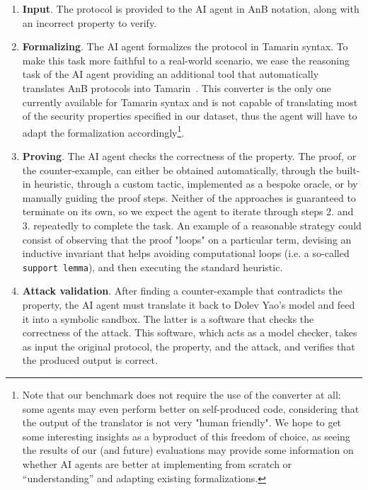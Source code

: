 \begin{enumerate}
    \item \textbf{Input}. The protocol is provided to the AI agent in AnB notation, along with an incorrect property to verify.
    \item \textbf{Formalizing}. The AI agent formalizes the protocol in Tamarin syntax. To make this task more faithful to a real-world scenario, we ease the reasoning task of the AI agent providing an additional tool that automatically translates AnB protocols into Tamarin~\cite{basin2015alice}. This converter is the only one currently available for Tamarin syntax and is not capable of translating most of the security properties specified in our dataset, thus the agent will have to adapt the formalization accordingly\footnote{Note that our benchmark does not require the use of the converter at all: some agents may even perform better on self-produced code, considering that the output of the translator is not very "human friendly". We hope to get some interesting insights as a byproduct of this freedom of choice, as seeing the results of our (and future) evaluations may provide some information on whether AI agents are better at implementing from scratch or “understanding” and adapting existing formalizations.}.
    \item \textbf{Proving}. The AI agent checks the correctness of the property. The proof, or the counter-example, can either be obtained automatically, through the built-in heuristic, through a custom tactic, implemented as a bespoke oracle, or by manually guiding the proof steps. Neither of the approaches is guaranteed to terminate on its own, so we expect the agent to iterate through steps 2. and 3. repeatedly to complete the task. An example of a reasonable strategy could consist of observing that the proof "loops" on a particular term, devising an inductive invariant that helps avoiding computational loops (i.e. a so-called \texttt{support lemma}), and then executing the standard heuristic.
    \item \textbf{Attack validation}. After finding a counter-example that contradicts the property, the AI agent must translate it back to Dolev Yao's model and feed it into a symbolic sandbox. The latter is a software that checks the correctness of the attack. This software, which acts as a model checker, takes as input the original protocol, the property, and the attack, and verifies that the produced output is correct.
\end{enumerate}


